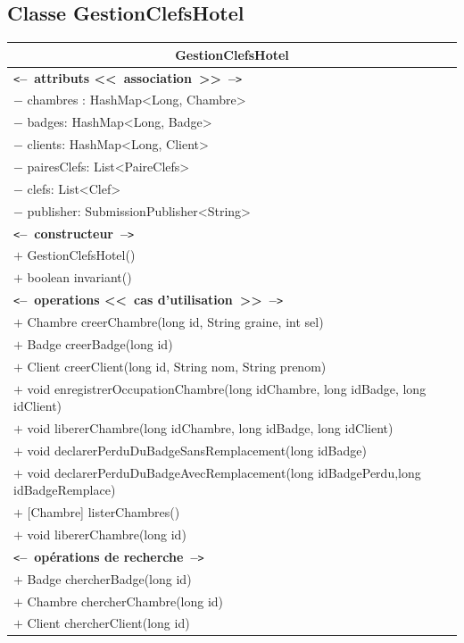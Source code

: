 \documentclass[11pt,article]{article}
\newcommand{\cmt}[1]{\texttt{<}\textbf{--~#1~--}\texttt{>}}
\begin{document}
  \subsection{Classe \textsf{GestionClefsHotel}}
  \begin{center}
	  \begin{longtable}{|p{15cm}|}
		  \hline
		  \multicolumn{1}{|c|}{{\Large \textsf{GestionClefsHotel}}} \\
		  \hline
		  \cmt{attributs <<~association~>>}\\
		  $-$ chambres : HashMap<Long, Chambre>  \\
		  $-$ badges: HashMap<Long, Badge>\\
		  $-$ clients: HashMap<Long, Client> \\
		  $-$ pairesClefs: List<PaireClefs> \\
		  $-$ clefs: List<Clef> \\
		  $-$ publisher: SubmissionPublisher<String> \\
		  \hline
		  \cmt{constructeur} \\
		  $+$ GestionClefsHotel() \\
		  $+$ boolean invariant() \\
		  \cmt{operations <<~cas d'utilisation~>>} \\
		  $+$ Chambre creerChambre(long id, String graine, int sel) \\
		  $+$ Badge creerBadge(long id) \\
		  $+$ Client creerClient(long id, String nom, String prenom) \\
		  $+$ void enregistrerOccupationChambre(long idChambre, long idBadge, long idClient) \\
		  $+$ void libererChambre(long idChambre, long idBadge, long idClient) \\
		  $+$ void declarerPerduDuBadgeSansRemplacement(long idBadge)\\
		  $+$ void declarerPerduDuBadgeAvecRemplacement(long idBadgePerdu,long idBadgeRemplace) \\
		  $+$ [Chambre] listerChambres() \\
		  $+$ void libererChambre(long id) \\
		  \cmt{opérations de recherche} \\
		  $+$ Badge chercherBadge(long id) \\
		  $+$ Chambre chercherChambre(long id) \\
		  $+$ Client chercherClient(long id) \\
		  \hline
	  \end{longtable}
  \end{center}
\end{document}
